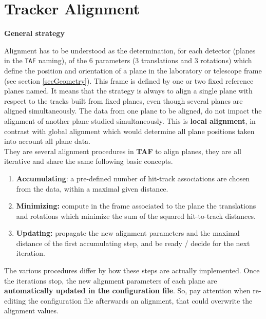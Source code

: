 \documentclass[a4paper, 12pt, twoside]{article}
\newif\ifwithcomment
\newcommand{\comment}[1]{\ifwithcomment {\textcolor{blue}{\it#1}} \fi}
\newcommand{\TAF}{{\bf TAF }}
\begin{document}
\vspace{2cm}

\section{Tracker Alignment}
\label{secAlign}

\comment{There is no explanation about the choice of the hit with respect to a track, wether it is the nearest or any of them. The method to align ladder with minivector is not described here.}

\noindent 
{\bf General strategy}

\noindent
Alignment has to be understood as the determination, for each detector (planes in the {\tt TAF} naming), of the 6 parameters (3 translations and 3 rotations) which define the position and orientation of a plane in the laboratory or telescope frame (see section \ref{secGeometry}). This frame is defined by one or two fixed reference planes named. It means that the strategy is always to align a single plane with respect to the tracks built from fixed planes, even though several planes are aligned simultaneously. The data from one plane to be aligned, do not impact the alignment of another plane studied simultaneously. This is {\bf local alignment}, in contrast with global alignment which would determine all plane positions taken into account all plane data.\\

\noindent
They are several alignment procedures in \TAF to align planes, they are all iterative and share the same following basic concepts.
\begin{enumerate}
\item {\bf Accumulating}: a pre-defined number of hit-track associations are chosen from the data, within a maximal given distance.
\item {\bf Minimizing:} compute in the frame associated to the plane the translations and rotations which minimize the sum of the squared hit-to-track distances.
\item {\bf Updating:} propagate the new alignment parameters and the maximal distance of the first accumulating step, and be ready / decide for the next iteration.
\end{enumerate}
The various procedures differ by how these steps are actually implemented. Once the iterations stop, the new alignment parameters of each plane are {\bf automatically updated in the configuration file}. So, pay attention when re-editing the configuration file afterwards an alignment, that could overwrite the alignment values.\\
\end{document}
